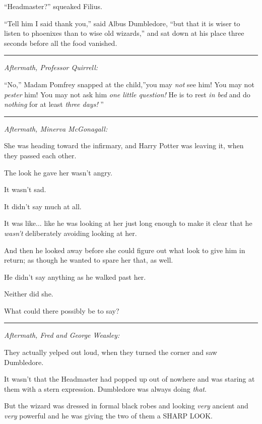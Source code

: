 ``Headmaster?'' squeaked Filius.

``Tell him I said thank you,'' said Albus Dumbledore, ``but that it is
wiser to listen to phoenixes than to wise old wizards,'' and sat down at
his place three seconds before all the food vanished.

\begin{center}\rule{3in}{0.4pt}\end{center}

\emph{Aftermath, Professor Quirrell:}

``No,'' Madam Pomfrey snapped at the child,''you may \emph{not} see him!
You may not \emph{pester} him! You may not ask him \emph{one little
question!} He is to rest \emph{in bed} and do \emph{nothing} for at
least \emph{three days!} ''

\begin{center}\rule{3in}{0.4pt}\end{center}

\emph{Aftermath, Minerva McGonagall:}

She was heading toward the infirmary, and Harry Potter was leaving it,
when they passed each other.

The look he gave her wasn't angry.

It wasn't sad.

It didn't say much at all.

It was like... like he was looking at her just long enough to make
it clear that he \emph{wasn't} deliberately avoiding looking at her.

And then he looked away before she could figure out what look to give
him in return; as though he wanted to spare her that, as well.

He didn't say anything as he walked past her.

Neither did she.

What could there possibly be to say?

\begin{center}\rule{3in}{0.4pt}\end{center}

\emph{Aftermath, Fred and George Weasley:}

They actually yelped out loud, when they turned the corner and saw
Dumbledore.

It wasn't that the Headmaster had popped up out of nowhere and was
staring at them with a stern expression. Dumbledore was always doing
\emph{that}.

But the wizard was dressed in formal black robes and looking \emph{very}
ancient and \emph{very} powerful and he was giving the two of them a
SHARP LOOK.

